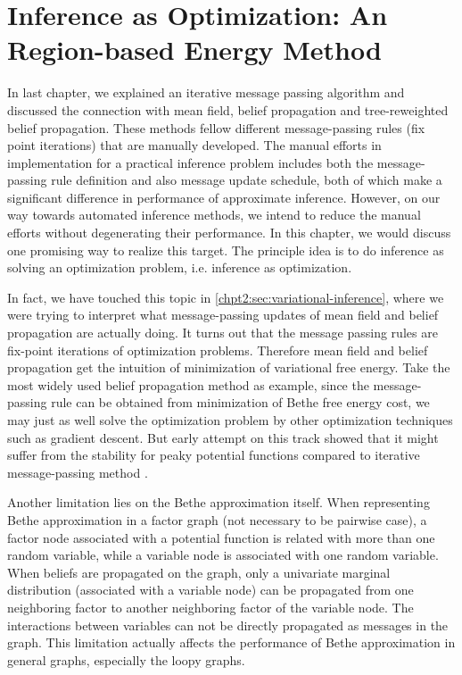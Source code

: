 \chapter{Inference as Optimization: An Region-based Energy Method}

In last chapter, we explained an iterative message passing algorithm and discussed the connection with mean field, belief propagation and tree-reweighted belief propagation. These methods fellow different message-passing rules (fix point iterations) that are manually developed. The manual efforts in implementation for a practical inference problem includes both the message-passing rule definition and also message update schedule, both of which make a significant difference in performance of approximate inference. However, on our way towards automated inference methods, we intend to reduce the manual efforts without degenerating their performance. In this chapter, we would discuss one promising way to realize this target. The principle idea is to do inference as solving an optimization problem, i.e. inference as optimization.

In fact, we have touched this topic in \autoref{chpt2:sec:variational-inference}, where we were trying to interpret what message-passing updates of mean field and belief propagation are actually doing. It turns out that the message passing rules are fix-point iterations of optimization problems. Therefore mean field and belief propagation get the intuition of minimization of variational free energy. Take the most widely used belief propagation method as example, since the message-passing rule can be obtained from minimization of Bethe free energy cost, we may just as well solve the optimization problem by other optimization techniques such as gradient descent. But early attempt on this track showed that it might suffer from the stability for peaky potential functions compared to iterative message-passing method \cite{welling2001belief}.


Another limitation lies on the Bethe approximation itself. When representing Bethe approximation in a factor graph (not necessary to be pairwise case), a factor node associated with a potential function is related with more than one random variable, while a variable node is associated with one random variable. When beliefs are propagated on the graph, only a univariate marginal distribution (associated with a variable node) can be propagated from one neighboring factor to another neighboring factor of the variable node. The interactions between variables can not be directly propagated as messages in the graph. This limitation actually affects the performance of Bethe approximation in general graphs, especially the loopy graphs.

